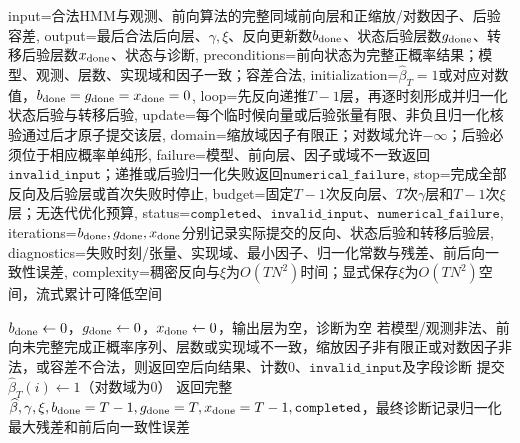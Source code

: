 \begin{AlgorithmContract}{
  input={合法HMM与观测、前向算法的完整同域前向层和正缩放/对数因子、后验容差},
  output={最后合法后向层、$\gamma,\xi$、反向更新数$b_{\rm done}$、状态后验层数$g_{\rm done}$、转移后验层数$x_{\rm done}$、状态与诊断},
  preconditions={前向状态为完整正概率结果；模型、观测、层数、实现域和因子一致；容差合法},
  initialization={$\widehat\beta_T=1$或对应对数值，$b_{\rm done}=g_{\rm done}=x_{\rm done}=0$},
  loop={先反向递推$T-1$层，再逐时刻形成并归一化状态后验与转移后验},
  update={每个临时候向量或后验张量有限、非负且归一化核验通过后才原子提交该层},
  domain={缩放域因子有限正；对数域允许$-\infty$；后验必须位于相应概率单纯形},
  failure={模型、前向层、因子或域不一致返回$\mathtt{invalid\_input}$；递推或后验归一化失败返回$\mathtt{numerical\_failure}$},
  stop={完成全部反向及后验层或首次失败时停止},
  budget={固定$T-1$次反向层、$T$次$\gamma$层和$T-1$次$\xi$层；无迭代优化预算},
  status={$\mathtt{completed}$、$\mathtt{invalid\_input}$、$\mathtt{numerical\_failure}$},
  iterations={$b_{\rm done},g_{\rm done},x_{\rm done}$分别记录实际提交的反向、状态后验和转移后验层},
  diagnostics={失败时刻/张量、实现域、最小因子、归一化常数与残差、前后向一致性误差},
  complexity={稠密反向与$\xi$为$O(TN^2)$时间；显式保存$\xi$为$O(TN^2)$空间，流式累计可降低空间}
}
\begin{algorithm}[H]
\caption{与前向缩放一致的后向算法}\label{alg:V3-C05-backward-scaled}
$b_{\rm done}\leftarrow0$，$g_{\rm done}\leftarrow0$，$x_{\rm done}\leftarrow0$，输出层为空，诊断为空\;
若模型/观测非法、前向未完整完成正概率序列、层数或实现域不一致，缩放因子非有限正或对数因子非法，或容差不合法，则返回空后向结果、计数$0$、$\mathtt{invalid\_input}$及字段诊断\;
提交$\widehat\beta_T(i)\leftarrow1$（对数域为$0$）\;
返回完整$\widehat\beta,\gamma,\xi,b_{\rm done}=T-1,g_{\rm done}=T,x_{\rm done}=T-1,\mathtt{completed}$，最终诊断记录归一化最大残差和前后向一致性误差\;
\end{algorithm}
\end{AlgorithmContract}

